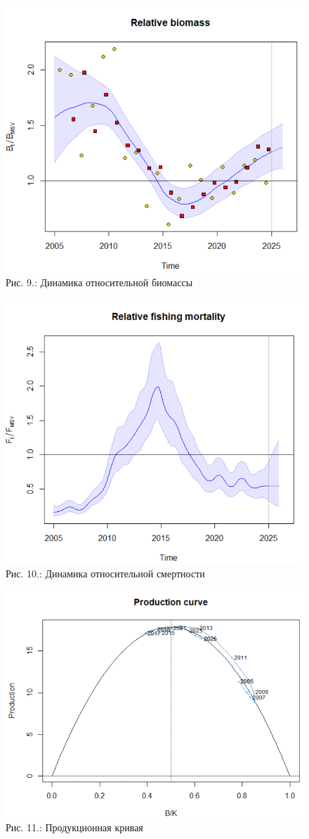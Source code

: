 \documentclass[
  letterpaper,
  DIV=11,
  numbers=noendperiod]{scrreprt}
\begin{document}
\begin{figure}[H]

{\centering \includegraphics[width=0.6\linewidth,height=\textheight,keepaspectratio]{images/SPICT9.PNG}

}

\caption{Рис. 9.: Динамика относительной биомассы}

\end{figure}%

\begin{figure}[H]

{\centering \includegraphics[width=0.6\linewidth,height=\textheight,keepaspectratio]{images/SPICT10.PNG}

}

\caption{Рис. 10.: Динамика относительной смертности}

\end{figure}%

\begin{figure}[H]

{\centering \includegraphics[width=0.6\linewidth,height=\textheight,keepaspectratio]{images/SPICT11.PNG}

}

\caption{Рис. 11.: Продукционная кривая}

\end{figure}%
\end{document}
